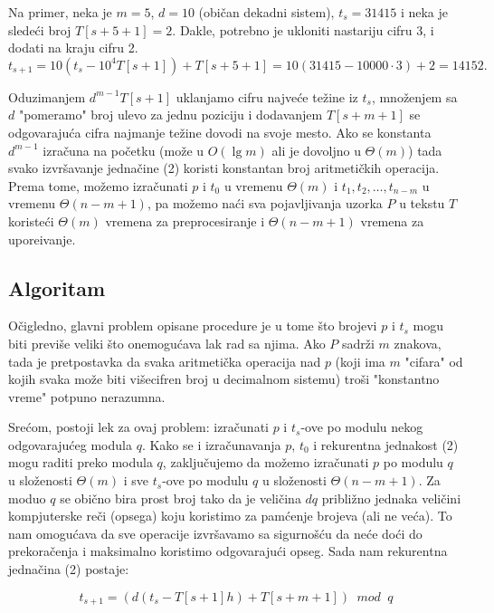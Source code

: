 \documentclass[a4paper,12pt]{article}
\begin{document}
Na primer, neka je $m = 5$, $d = 10$ (obi\v can dekadni sistem), $t_s = 31415$ i neka je slede\' ci broj $T[s + 5 + 1] = 2$. Dakle, potrebno je ukloniti nastariju cifru 3, i dodati na kraju cifru 2. $$ t_{s+1} = 10(t_s - 10^4T[s + 1]) + T[s + 5 + 1] = 10(31415 -10000 \cdot 3) + 2 = 14152. $$

Oduzimanjem $d^{m - 1}T[s + 1]$ uklanjamo cifru najve\' ce te\v zine iz $t_s$, mno\v zenjem sa $d$ "pomeramo" broj ulevo za jednu poziciju i dodavanjem $T[s + m + 1]$ se odgovaraju\' ca cifra najmanje te\v zine dovodi na svoje mesto. Ako se konstanta $d^{m - 1}$ izra\v cuna na po\v cetku (mo\v ze u $O(\lg m)$ ali je dovoljno u $\Theta(m)$) tada svako izvr\v savanje jedna\v cine (2) koristi konstantan broj aritmeti\v ckih operacija. Prema tome, mo\v zemo izra\v cunati $p$ i $t_0$ u vremenu $\Theta(m)$ i $t_1, t_2, \ldots, t_{n - m}$ u vremenu $\Theta(n - m + 1)$, pa mo\v zemo na\' ci sva pojavljivanja uzorka $P$ u tekstu $T$ koriste\' ci $\Theta(m)$ vremena za preprocesiranje i $\Theta(n - m + 1)$ vremena za upore\dj ivanje.

\subsection {Algoritam}

O\v cigledno, glavni problem opisane procedure je u tome \v sto brojevi $p$ i $t_s$ mogu biti previ\v se veliki \v sto onemogu\' cava lak rad sa njima. Ako $P$ sadr\v zi $m$ znakova, tada je pretpostavka da svaka aritmeti\v cka operacija nad $p$ (koji ima $m$ "cifara" od kojih svaka mo\v ze biti vi\v secifren broj u decimalnom sistemu) tro\v si "konstantno vreme" potpuno nerazumna.

Sre\' com, postoji lek za ovaj problem: izra\v cunati $p$ i $t_s$-ove po modulu nekog odgovaraju\' ceg modula $q$. Kako se i izra\v cunavanja $p$, $t_0$ i rekurentna jednakost (2) mogu raditi preko modula $q$, zaklju\v cujemo da mo\v zemo izra\v cunati $p$ po modulu $q$ u slo\v zenosti $\Theta(m)$ i sve $t_s$-ove po modulu $q$ u slo\v zenosti $\Theta(n - m + 1)$. Za moduo $q$ se obi\v cno bira prost broj tako da je veli\v cina $dq$ pribli\v zno jednaka veli\v cini kompjuterske re\v ci (opsega) koju koristimo za pam\' cenje brojeva (ali ne ve\' ca). To nam omogu\' cava da sve operacije izvr\v savamo sa sigurno\v s\' cu da ne\' ce do\' ci do prekora\v cenja i maksimalno koristimo odgovaraju\' ci opseg. Sada nam rekurentna jedna\v cina (2) postaje:

\begin{equation}
t_{s + 1} = (d(t_s - T[s + 1]h) + T[s + m + 1]) \phantom{a} mod \phantom{a} q
\end{equation}
\end{document}
